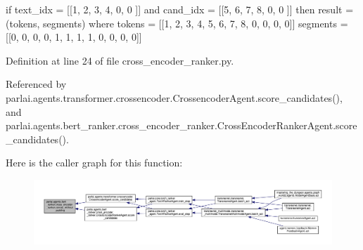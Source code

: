 \begin{DoxyVerb}if text_idx = [[1, 2, 3, 4, 0, 0  ]]
        and cand_idx = [[5, 6, 7, 8, 0, 0 ]]
        then result = (tokens, segments) where
        tokens = [[1, 2, 3, 4, 5, 6, 7, 8, 0, 0, 0, 0]]
        segments = [[0, 0, 0, 0, 1, 1, 1, 1, 0, 0, 0, 0]]\end{DoxyVerb}
 

Definition at line 24 of file cross\+\_\+encoder\+\_\+ranker.\+py.



Referenced by parlai.\+agents.\+transformer.\+crossencoder.\+Crossencoder\+Agent.\+score\+\_\+candidates(), and parlai.\+agents.\+bert\+\_\+ranker.\+cross\+\_\+encoder\+\_\+ranker.\+Cross\+Encoder\+Ranker\+Agent.\+score\+\_\+candidates().

Here is the caller graph for this function\+:
\nopagebreak
\begin{figure}[H]
\begin{center}
\leavevmode
\includegraphics[width=350pt]{namespaceparlai_1_1agents_1_1bert__ranker_1_1cross__encoder__ranker_a3914765cd62574f6f077c6e2e0070ab4_icgraph}
\end{center}
\end{figure}
